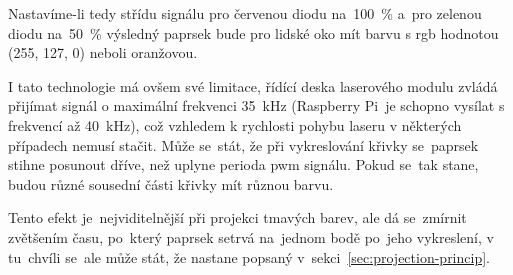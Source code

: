 Nastavíme-li tedy střídu signálu pro červenou diodu na~100~\% a~pro zelenou diodu na~50~\% výsledný paprsek bude pro lidské oko mít barvu s rgb hodnotou (255, 127, 0) neboli oranžovou.

I tato technologie má ovšem své limitace, řídící deska laserového modulu zvládá přijímat signál o maximální frekvenci 35~kHz (Raspberry Pi~je schopno vysílat s frekvencí až 40~kHz), což vzhledem k rychlosti pohybu laseru v některých případech nemusí stačit.
Může se~stát, že při vykreslování křivky se~paprsek stihne posunout dříve, než uplyne perioda pwm signálu. Pokud se~tak stane, budou různé sousední části křivky mít různou barvu.


Tento efekt je~nejviditelnější při projekci tmavých barev, ale dá se~zmírnit zvětšením času, po~který paprsek setrvá na~jednom bodě po~jeho vykreslení, v tu~chvíli se~ale může stát, že nastane  popsaný v~sekci~\ref{sec:projection-princip}.